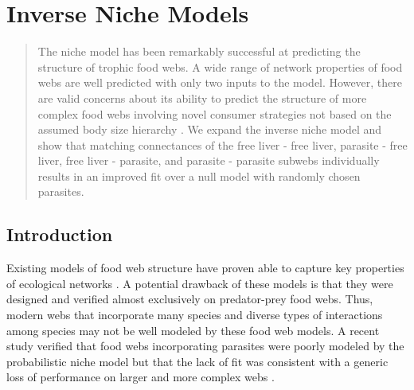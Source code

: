 \documentclass[/home/nkappler/Research/Dissertation/
 dissertation.tex]{subfiles}
\begin{document}
\chapter{Inverse Niche Models}

\begin{bibunit}

\begin{abstract} 

    The niche model \cite{Williams2000} has been remarkably successful at
    predicting the structure of trophic food webs. A wide range of network
    properties of food webs are well predicted with only two inputs to the
    model. However, there are valid concerns about its ability to predict the
    structure of more complex food webs involving novel consumer strategies not
    based on the assumed body size hierarchy \cite{Williams2011}. We expand the
    inverse niche model \cite{Warren2010} and show that matching connectances
    of the free liver - free liver, parasite - free liver, free liver -
    parasite, and parasite - parasite subwebs individually results in an
    improved fit over a null model with randomly chosen parasites.  

\end{abstract}

\newpage

\section{Introduction}

Existing models of food web structure have proven able to capture key
properties of ecological networks \cite{Williams2000, Allesina2008,
Williams2010, Williams2008b}. A potential drawback of these models is that they
were designed and verified almost exclusively on predator-prey food webs. Thus,
modern webs that incorporate many species and diverse types of interactions
among species \cite{Kefi2016, Hechinger2011a, Thieltges2011, Zander2011,
Mouritsen2011} may not be well modeled by these food web models. A recent study
verified that food webs incorporating parasites were poorly modeled by the
probabilistic niche model but that the lack of fit was consistent with a
generic loss of performance on larger and more complex webs \cite{Dunne2013}. 


\end{bibunit}
\end{document}
